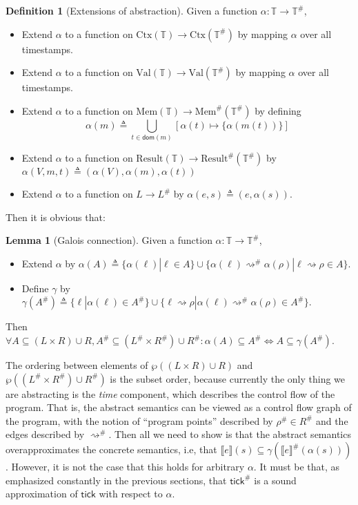 \documentclass[acmsmall,review]{acmart}\settopmatter{printfolios=true,printccs=false,printacmref=false}
\theoremstyle{definition}
\newtheorem{definition}{Definition}[section]
\newtheorem{lem}{Lemma}[section]
\newcommand*{\A}[1]{{#1}^{\#}}
\newcommand*{\Time}{\mathbb{T}}
\newcommand*{\ATime}{\A{\Time}}
\newcommand*{\Ctx}[1]{\text{Ctx}({#1})}
\newcommand*{\Value}[1]{\text{Val}({#1})}
\newcommand*{\Mem}[1]{\text{Mem}({#1})}
\newcommand*{\mem}{m}
\newcommand*{\AMem}[1]{\A{\text{Mem}}({#1})}
\newcommand*{\Result}[1]{\text{Result}({#1})}
\newcommand*{\AResult}[1]{\A{\text{Result}}({#1})}
\newcommand*{\sembracket}[1]{\lBrack{#1}\rBrack}
\newcommand*{\tick}{\mathsf{tick}}
\begin{document}
\begin{definition}[Extensions of abstraction]
  Given a function $\alpha:\Time\rightarrow\ATime$,
  \begin{itemize}
    \item Extend $\alpha$ to a function on $\Ctx{\Time}\rightarrow\Ctx{\ATime}$ by mapping $\alpha$ over all timestamps.
    \item Extend $\alpha$ to a function on $\Value{\Time}\rightarrow\Value{\ATime}$ by mapping $\alpha$ over all timestamps.
    \item Extend $\alpha$ to a function on $\Mem{\Time}\rightarrow\AMem{\ATime}$ by defining
          \[\alpha(\mem)\triangleq\bigcup_{t\in\mathsf{dom}(\mem)}[\alpha(t)\mapsto\{\alpha(\mem(t))\}]\]
    \item Extend $\alpha$ to a function on $\Result{\Time}\rightarrow\AResult{\ATime}$ by $\alpha(V,\mem,t)\triangleq(\alpha(V),\alpha(\mem),\alpha(t))$
    \item Extend $\alpha$ to a function on $L\rightarrow\A{L}$ by $\alpha(e,s)\triangleq(e,\alpha(s))$.
  \end{itemize}
\end{definition}

Then it is obvious that:
\begin{lem}[Galois connection]
  Given a function $\alpha:\Time\rightarrow\ATime$,
  \begin{itemize}
    \item Extend $\alpha$ by ${\alpha}(A)\triangleq\{\alpha(\ell)|\ell\in A\}\cup\{\alpha(\ell)\A\rightsquigarrow\alpha(\rho)|\ell\rightsquigarrow\rho\in A\}$.
    \item Define ${\gamma}$ by ${\gamma}(\A{A})\triangleq\{\ell|\alpha(\ell)\in\A{A}\}\cup\{\ell\rightsquigarrow\rho|\alpha(\ell)\A\rightsquigarrow\alpha(\rho)\in\A{A}\}$.
  \end{itemize}
  Then $\forall A\subseteq(L\times R)\cup R,\A{A}\subseteq(\A{L}\times\A{R})\cup\A{R}:{\alpha}(A)\subseteq\A{A}\Leftrightarrow A\subseteq{\gamma}(\A{A})$.
\end{lem}

The ordering between elements of $\wp((L\times R)\cup R)$ and $\wp((\A{L}\times\A{R})\cup\A{R})$ is the subset order, because currently the only thing we are abstracting is the \emph{time} component, which describes the control flow of the program.
That is, the abstract semantics can be viewed as a control flow graph of the program, with the notion of ``program points'' described by $\A\rho\in \A{R}$ and the edges described by $\A\rightsquigarrow$.
Then all we need to show is that the abstract semantics overapproximates the concrete semantics, i.e, that $\sembracket{e}(s)\subseteq\gamma(\A{\sembracket{e}}(\alpha(s)))$.
However, it is not the case that this holds for arbitrary $\alpha$.
It must be that, as emphasized constantly in the previous sections, that $\A\tick$ is a sound approximation of $\tick$ with respect to $\alpha$.
\end{document}
